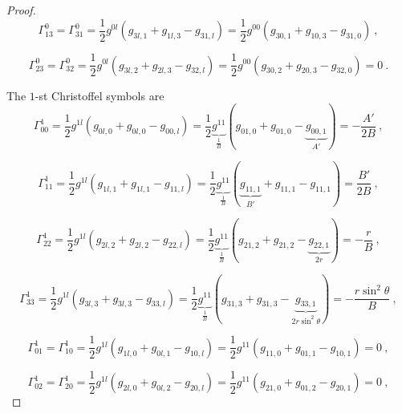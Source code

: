 \begin{proof}
        \begin{equation*}
            \Gamma^0_{13} = \Gamma^0_{31} = \frac{1}{2} g^{0l} (g_{3l,1} + g_{1l,3} - g_{31,l}) = \frac{1}{2} g^{00} (g_{30,1} + g_{10,3} - g_{31,0}) ~,
        \end{equation*}

        \begin{equation*}
            \Gamma^0_{23} = \Gamma^0_{32} = \frac{1}{2} g^{0l} (g_{3l,2} + g_{2l,3} - g_{32,l}) = \frac{1}{2} g^{00} (g_{30,2} + g_{20,3} - g_{32,0}) = 0 ~.
        \end{equation*}

        The $1$-st Christoffel symbols are 
        \begin{equation*}
            \Gamma^1_{00} = \frac{1}{2} g^{1l} (g_{0l,0} + g_{0l,0} - g_{00,l}) =  \frac{1}{2} \underbrace{g^{11}}_{\frac{1}{B}} (g_{01,0} + g_{01,0} - \underbrace{g_{00,1}}_{A'}) = - \frac{A'}{2B} ~,
        \end{equation*}

        \begin{equation*}
            \Gamma^1_{11} = \frac{1}{2} g^{1l} (g_{1l,1} + g_{1l,1} - g_{11,l}) =  \frac{1}{2} \underbrace{g^{11}}_{\frac{1}{B}} (\underbrace{g_{11,1}}_{B'} + g_{11,1} - g_{11,1}) = \frac{B'}{2B} ~,
        \end{equation*}

        \begin{equation*}
            \Gamma^1_{22} = \frac{1}{2} g^{1l} (g_{2l,2} + g_{2l,2} - g_{22,l}) =  \frac{1}{2} \underbrace{g^{11}}_{\frac{1}{B}} (g_{21,2} + g_{21,2} - \underbrace{g_{22,1}}_{2r}) = -\frac{r}{B} ~,
        \end{equation*}

        \begin{equation*}
            \Gamma^1_{33} = \frac{1}{2} g^{1l} (g_{3l,3} + g_{3l,3} - g_{33,l}) =  \frac{1}{2} \underbrace{g^{11}}_{\frac{1}{B}} (g_{31,3} + g_{31,3} - \underbrace{g_{33,1}}_{2 r \sin^2 \theta}) = - \frac{r \sin^2 \theta}{B} ~,
        \end{equation*}

        \begin{equation*}
            \Gamma^1_{01} = \Gamma^1_{10} = \frac{1}{2} g^{1l} (g_{1l,0} + g_{0l,1} - g_{10,l}) =  \frac{1}{2} g^{11} (g_{11,0} + g_{01,1} - g_{10,1}) = 0 ~,
        \end{equation*}

        \begin{equation*}
            \Gamma^1_{02} = \Gamma^1_{20} = \frac{1}{2} g^{1l} (g_{2l,0} + g_{0l,2} - g_{20,l}) =  \frac{1}{2} g^{11} (g_{21,0} + g_{01,2} - g_{20,1}) = 0 ~,
        \end{equation*}


\end{proof}
